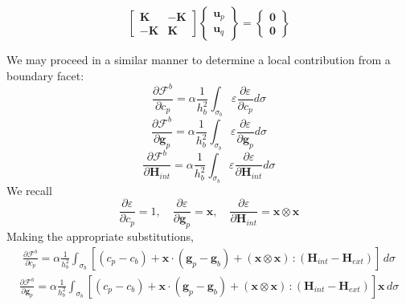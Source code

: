 \documentclass[11pt]{article} %
\begin{document}
\begin{equation}
	\left[ \begin{array}{cc} \mathbf{K} & -\mathbf{K} \\ -\mathbf{K} & \mathbf{K} \end{array} \right] \left\{ \begin{array}{c} \mathbf{u}_p \\ \mathbf{u}_q \end{array} \right\} = \left\{ \begin{array}{c} \mathbf{0} \\ \mathbf{0} \end{array} \right\}
\end{equation}

We may proceed in a similar manner to determine a local contribution from a boundary facet:
\begin{equation}
	\frac{\partial \mathcal{F}^b}{\partial c_p} = \alpha \frac{1}{h_b^2} \int_{\sigma_b} \varepsilon \frac{\partial \varepsilon}{\partial c_p} d \sigma
\end{equation}
\begin{equation}
	\frac{\partial \mathcal{F}^b}{\partial \mathbf{g}_p} = \alpha \frac{1}{h_b^2} \int_{\sigma_b} \varepsilon \frac{\partial \varepsilon}{\partial \mathbf{g}_p} d \sigma
\end{equation}
\begin{equation}
	\frac{\partial \mathcal{F}^b}{\partial \mathbf{H}_{int}} = \alpha \frac{1}{h_b^2} \int_{\sigma_b} \varepsilon \frac{\partial \varepsilon}{\partial \mathbf{H}_{int}} d \sigma
\end{equation}
We recall
\begin{equation}
	\frac{\partial \varepsilon}{\partial c_p} = 1, \quad \frac{\partial \varepsilon}{\partial \mathbf{g}_p} = \mathbf{x}, \quad \frac{\partial \varepsilon}{\partial \mathbf{H}_{int}} = \mathbf{x} \otimes \mathbf{x}
\end{equation}
Making the appropriate substitutions,
\begin{eqnarray}
	\frac{\partial \mathcal{F}^b}{\partial c_p} = \alpha \frac{1}{h_b^2} \int_{\sigma_b} \left[ (c_p - c_b) + \mathbf{x} \cdot (\mathbf{g}_p - \mathbf{g}_b) + (\mathbf{x} \otimes \mathbf{x}) \, \colon (\mathbf{H}_{int} - \mathbf{H}_{ext}) \right] \, d \sigma
\end{eqnarray}
\begin{eqnarray}
	\frac{\partial \mathcal{F}^b}{\partial \mathbf{g}_p} = \alpha \frac{1}{h_b^2} \int_{\sigma_b} \left[ (c_p - c_b) + \mathbf{x} \cdot (\mathbf{g}_p - \mathbf{g}_b) + (\mathbf{x} \otimes \mathbf{x}) \, \colon (\mathbf{H}_{int} - \mathbf{H}_{ext}) \right] \mathbf{x} \, d \sigma
\end{eqnarray}
\end{document}
